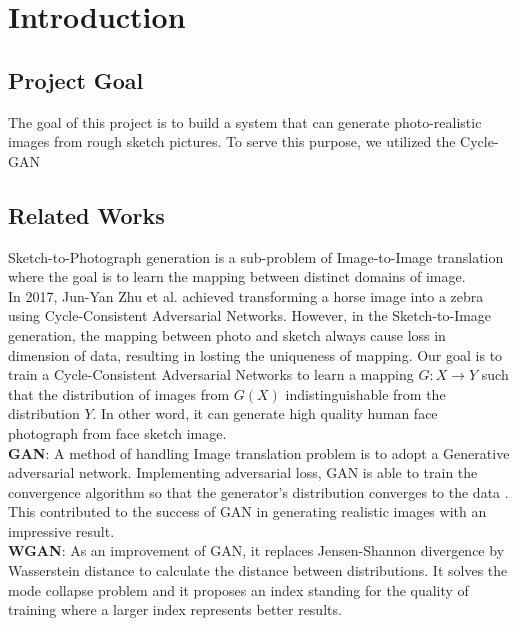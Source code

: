 \chapter{Introduction}\label{Ch:Introduction}

\section{Project Goal}

The goal of this project is to build a system that can generate photo-realistic images from rough sketch pictures. To serve this purpose, we utilized the Cycle-GAN~\cite{CycleGAN} \\

\section{Related Works}

Sketch-to-Photograph generation is a sub-problem of Image-to-Image translation where the goal is to learn the mapping between distinct domains of image. \\

In 2017, Jun-Yan Zhu et al. achieved transforming a horse image into a zebra using Cycle-Consistent Adversarial Networks. However, in the Sketch-to-Image generation, the mapping between photo and sketch always cause loss in dimension of data, resulting in losting the uniqueness of mapping. Our goal is to train a Cycle-Consistent Adversarial Networks to learn a mapping \(G:X \rightarrow Y\) such that the distribution of images from \(G(X)\) indistinguishable from the distribution \(Y\). In other word, it can generate high quality human face photograph from face sketch image. \\

\textbf{GAN}: A method of handling Image translation problem is to adopt a Generative adversarial network. Implementing adversarial loss, GAN is able to train the convergence algorithm so that the generator's distribution converges to the data\cite{GANs0} . This contributed to the success of GAN in generating realistic images with an impressive result. \\

\textbf{WGAN}: As an improvement of GAN, it replaces Jensen-Shannon divergence by Wasserstein distance to calculate the distance between distributions. It solves the mode collapse problem and it proposes an index standing for the quality of training where a larger index represents better results. \\

